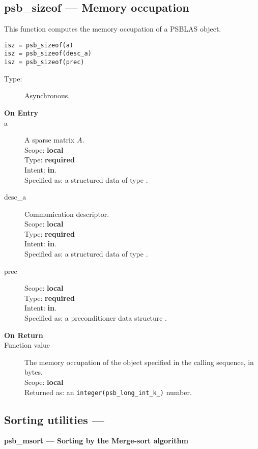 \clearpage\subsection*{psb\_sizeof --- Memory occupation}

This function computes the memory occupation of a PSBLAS object.


\begin{verbatim}
isz = psb_sizeof(a)
isz = psb_sizeof(desc_a)
isz = psb_sizeof(prec)
\end{verbatim}

\begin{description}
\item[Type:] Asynchronous.
\item[\bf On Entry]
\item[a] A sparse matrix
$A$. \\ 
Scope: {\bf local} \\
Type: {\bf required}\\
Intent: {\bf in}.\\
Specified as: a structured data of type \spdata.
\item[desc\_a] Communication descriptor.\\
Scope: {\bf local} \\
Type: {\bf required}\\
Intent: {\bf in}.\\
Specified as: a structured data of type \descdata.
\item[prec] 
Scope: {\bf local} \\
Type: {\bf required}\\
Intent: {\bf in}.\\
Specified as: a preconditioner data structure \precdata.
\item[\bf On Return] 
\item[Function value] The memory occupation of the object specified in
  the calling sequence, in bytes.\\
Scope: {\bf local} \\
Returned  as: an \verb|integer(psb_long_int_k_)| number.
\end{description}


\clearpage\subsection*{Sorting utilities --- }

{\par\noindent\large\bfseries psb\_msort --- Sorting by the Merge-sort
  algorithm}

